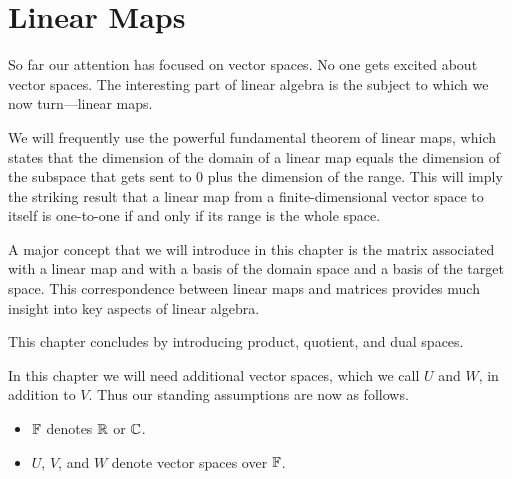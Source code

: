 \chapter{Linear Maps}

So far our attention has focused on vector spaces. No one gets excited about
vector spaces. The interesting part of linear algebra is the subject to which
we now turn---linear maps.

We will frequently use the powerful fundamental theorem of linear maps, which
states that the dimension of the domain of a linear map equals the dimension of
the subspace that gets sent to $0$ plus the dimension of the range. This will
imply the striking result that a linear map from a finite-dimensional vector
space to itself is one-to-one if and only if its range is the whole space.

A major concept that we will introduce in this chapter is the matrix associated
with a linear map and with a basis of the domain space and a basis of the
target space. This correspondence between linear maps and matrices provides
much insight into key aspects of linear algebra.

This chapter concludes by introducing product, quotient, and dual spaces.

In this chapter we will need additional vector spaces, which we call $U$ and
$W$, in addition to $V$. Thus our standing assumptions are now as follows.

\begin{definition*}\leavevmode
\begin{itemize}
\item $\mathbb{F}$ denotes $\mathbb{R}$ or $\mathbb{C}$.
\item $U$, $V$, and $W$ denote vector spaces over $\mathbb{F}$.
\end{itemize}
\end{definition*}

